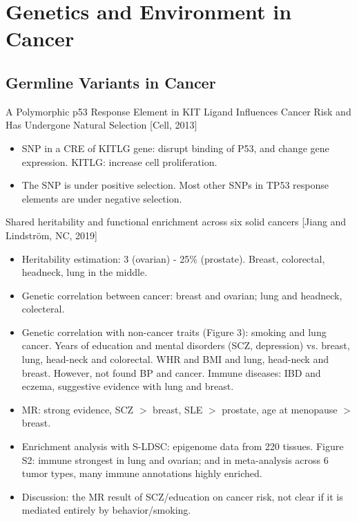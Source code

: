 \documentclass{report}
\begin{document}
\chapter{Genetics and Environment in Cancer}
\section{Germline Variants in Cancer}

A Polymorphic p53 Response Element in KIT Ligand Influences Cancer Risk and Has Undergone Natural Selection [Cell, 2013]
\begin{itemize}
	\item SNP in a CRE of KITLG gene: disrupt binding of P53, and change gene expression. KITLG: increase cell proliferation.
	
	\item The SNP is under positive selection. Most other SNPs in TP53 response elements are under negative selection.
\end{itemize}

Shared heritability and functional enrichment across six solid cancers [Jiang and Lindström, NC, 2019]
\begin{itemize}
	\item Heritability estimation: 3 (ovarian) - 25\% (prostate). Breast, colorectal, headneck, lung in the middle.
	
	\item Genetic correlation between cancer: breast and ovarian; lung and headneck, colecteral.
	
	\item Genetic correlation with non-cancer traits (Figure 3): smoking and lung cancer. Years of education and mental disorders (SCZ, depression) vs. breast, lung, head-neck and colorectal. WHR and BMI and lung, head-neck and breast. However, not found BP and cancer. Immune diseases: IBD and eczema, suggestive evidence with lung and breast.
	
	\item MR: strong evidence, SCZ $>$ breast, SLE $>$ prostate, age at menopause $>$ breast.
	
	\item Enrichment analysis with S-LDSC: epigenome data from 220 tissues. Figure S2: immune strongest in lung and ovarian; and in meta-analysis across 6 tumor types, many immune annotations highly enriched.
	
	\item Discussion: the MR result of SCZ/education on cancer risk, not clear if it is mediated entirely by behavior/smoking.
\end{itemize}
\end{document}

